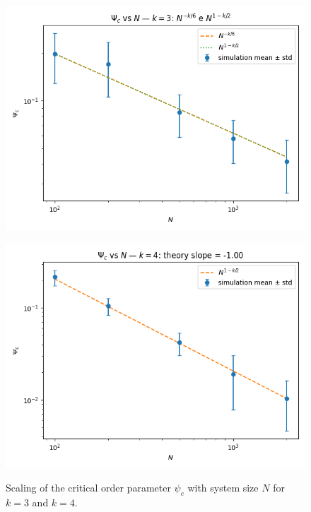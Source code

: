 \begin{figure}[h!]
    \centering
    \setlength{\tabcolsep}{2pt}
    \begin{minipage}[t]{0.48\textwidth}
        \centering
        \includegraphics[width=\textwidth]{images/IMAGES TASK2/ER_psic_vsN_k3.png}
        \label{fig:psic_k3}
    \end{minipage}
    \hfill
    \begin{minipage}[t]{0.48\textwidth}
        \centering
        \includegraphics[width=\textwidth]{images/IMAGES TASK2/ER_psic_vsN_k4.png}
        \label{fig:psic_k4}
    \end{minipage}
    \caption{Scaling of the critical order parameter $\psi_c$ with system size $N$ for $k=3$ and $k=4$.}
    \label{fig:psic_scaling}
\end{figure}

